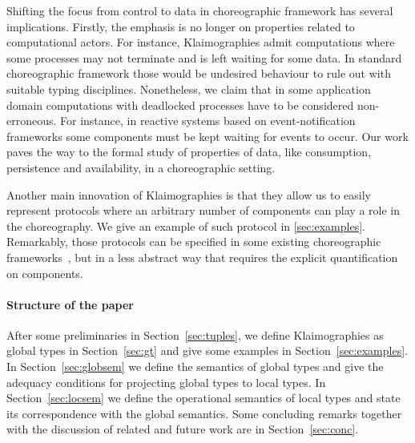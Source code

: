 Shifting the focus from control to data in choreographic framework has
several implications.
%
Firstly, the emphasis is no longer on properties related to
computational actors.
%
For instance, Klaimographies admit computations where some processes
may not terminate and is left waiting for some data.
%
In standard choreographic framework those would be undesired behaviour
to rule out with suitable typing disciplines.
%
Nonetheless, we claim that in some application domain computations with
deadlocked processes have to be considered non-erroneous.
%
For instance, in reactive systems based on event-notification
frameworks some  components must be kept waiting for
events to occur.
%
Our work paves the way to the formal study of properties of data, like consumption, persistence and availability, in a choreographic setting.

Another main innovation of Klaimographies is that they allow us to easily
represent protocols where an arbitrary number of components can
play a role in the choreography.
%
We give an example of such protocol in \cref{sec:examples}.
%
Remarkably, those protocols can be specified in some existing
choreographic frameworks~\cite{ydbh10,chjny19}, but in a less abstract way
that requires the explicit quantification on components.

\paragraph{Structure of the paper}
After some preliminaries in Section~\ref{sec:tuples}, we define Klaimographies as global types in Section~\ref{sec:gt} and give some examples in Section~\ref{sec:examples}.
In Section~\ref{sec:globsem} we define the semantics of global types and give the adequacy conditions for projecting global types to local types.
In Section~\ref{sec:locsem} we define the operational semantics of local types and state its correspondence with the global semantics.
Some concluding remarks together with the discussion of related and future work are in Section~\ref{sec:conc}.


